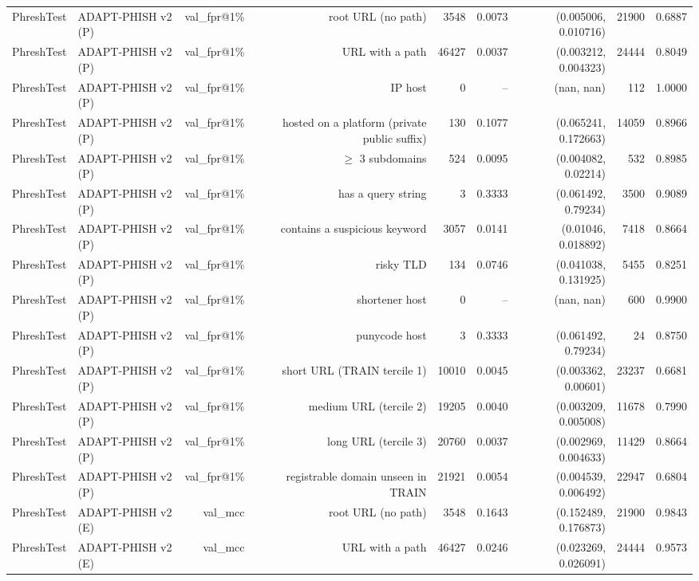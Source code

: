 \begin{table}[t]
\begin{tabular}{llrrrrrrr}
PhreshTest & ADAPT-PHISH v2 (P) & val\_fpr@1\% & root URL (no path) & 3548 & 0.0073 & (0.005006, 0.010716) & 21900 & 0.6887 \\
PhreshTest & ADAPT-PHISH v2 (P) & val\_fpr@1\% & URL with a path & 46427 & 0.0037 & (0.003212, 0.004323) & 24444 & 0.8049 \\
PhreshTest & ADAPT-PHISH v2 (P) & val\_fpr@1\% & IP host & 0 & -- & (nan, nan) & 112 & 1.0000 \\
PhreshTest & ADAPT-PHISH v2 (P) & val\_fpr@1\% & hosted on a platform (private public suffix) & 130 & 0.1077 & (0.065241, 0.172663) & 14059 & 0.8966 \\
PhreshTest & ADAPT-PHISH v2 (P) & val\_fpr@1\% & $\geq$ 3 subdomains & 524 & 0.0095 & (0.004082, 0.02214) & 532 & 0.8985 \\
PhreshTest & ADAPT-PHISH v2 (P) & val\_fpr@1\% & has a query string & 3 & 0.3333 & (0.061492, 0.79234) & 3500 & 0.9089 \\
PhreshTest & ADAPT-PHISH v2 (P) & val\_fpr@1\% & contains a suspicious keyword & 3057 & 0.0141 & (0.01046, 0.018892) & 7418 & 0.8664 \\
PhreshTest & ADAPT-PHISH v2 (P) & val\_fpr@1\% & risky TLD & 134 & 0.0746 & (0.041038, 0.131925) & 5455 & 0.8251 \\
PhreshTest & ADAPT-PHISH v2 (P) & val\_fpr@1\% & shortener host & 0 & -- & (nan, nan) & 600 & 0.9900 \\
PhreshTest & ADAPT-PHISH v2 (P) & val\_fpr@1\% & punycode host & 3 & 0.3333 & (0.061492, 0.79234) & 24 & 0.8750 \\
PhreshTest & ADAPT-PHISH v2 (P) & val\_fpr@1\% & short URL (TRAIN tercile 1) & 10010 & 0.0045 & (0.003362, 0.00601) & 23237 & 0.6681 \\
PhreshTest & ADAPT-PHISH v2 (P) & val\_fpr@1\% & medium URL (tercile 2) & 19205 & 0.0040 & (0.003209, 0.005008) & 11678 & 0.7990 \\
PhreshTest & ADAPT-PHISH v2 (P) & val\_fpr@1\% & long URL (tercile 3) & 20760 & 0.0037 & (0.002969, 0.004633) & 11429 & 0.8664 \\
PhreshTest & ADAPT-PHISH v2 (P) & val\_fpr@1\% & registrable domain unseen in TRAIN & 21921 & 0.0054 & (0.004539, 0.006492) & 22947 & 0.6804 \\
PhreshTest & ADAPT-PHISH v2 (E) & val\_mcc & root URL (no path) & 3548 & 0.1643 & (0.152489, 0.176873) & 21900 & 0.9843 \\
PhreshTest & ADAPT-PHISH v2 (E) & val\_mcc & URL with a path & 46427 & 0.0246 & (0.023269, 0.026091) & 24444 & 0.9573 \\

\end{tabular}
\end{table}
